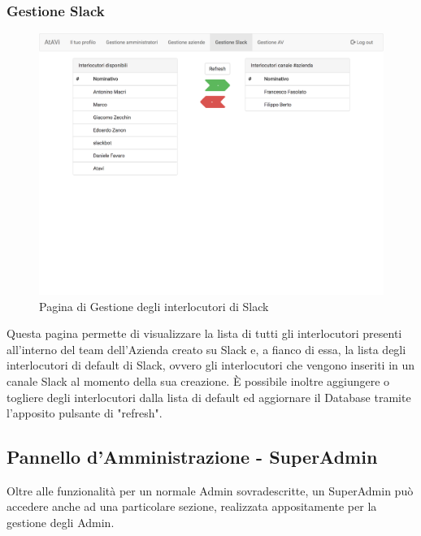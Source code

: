 \documentclass[../ManualeUtente_v1.0.0.tex]{subfiles}
\begin{document}
	\subsubsection{Gestione Slack}
	\begin{figure}[!h]
		\centering
		\includegraphics[scale=0.15]{Screenshot/admin-manageSlack.png}
		\caption{Pagina di Gestione degli interlocutori di Slack}
	\end{figure}
	Questa pagina permette di visualizzare la lista di tutti gli interlocutori presenti all'interno del team dell'Azienda creato su Slack e, a fianco di essa, la lista degli interlocutori di default di Slack, ovvero gli interlocutori che vengono inseriti in un canale Slack al momento della sua creazione.
	\newline
	È possibile inoltre aggiungere o togliere degli interlocutori dalla lista di default ed aggiornare il Database tramite l'apposito pulsante di "refresh".
	
	\newpage
	\subsection{Pannello d'Amministrazione - SuperAdmin}
	Oltre alle funzionalità per un normale Admin sovradescritte, un SuperAdmin può accedere anche ad una particolare sezione, realizzata appositamente per la gestione degli Admin.
\end{document}
